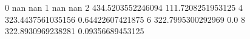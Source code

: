 0 nan nan
1 nan nan
2 434.5203552246094 111.7208251953125
4 323.4437561035156 0.64422607421875
6 322.7995300292969 0.0
8 322.8930969238281 0.09356689453125
